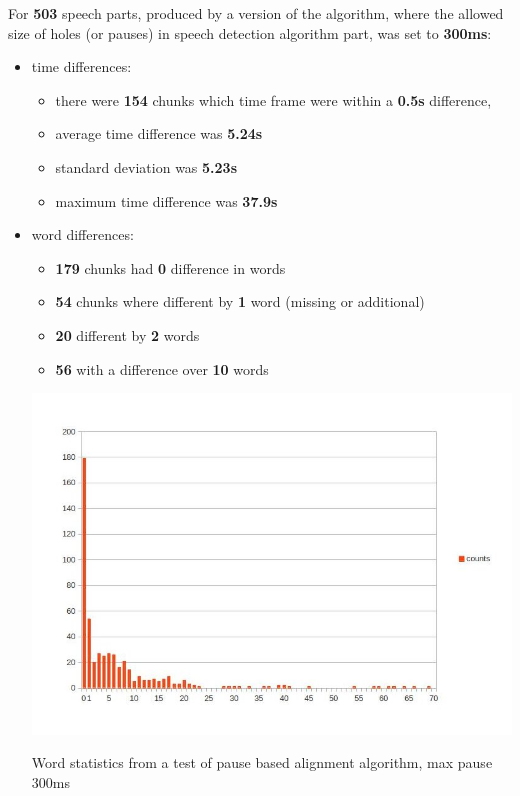 \documentclass[12pt,a4paper,english]{article}
\begin{document}
\newpage
For \textbf{503} speech parts, produced by a version of the algorithm, where the allowed size of holes (or pauses) in speech detection algorithm part,
was set to \textbf{300ms}:
\begin{itemize}
    \item time differences: \newline
    \begin{itemize}
        \item there were \textbf{154} chunks which time frame were within a \textbf{0.5s} difference, 
        \item average time difference was \textbf{5.24s}
        \item standard deviation was \textbf{5.23s}
        \item maximum time difference was \textbf{37.9s}
    \end{itemize}
    \item word differences:
    \begin{itemize}
        \item \textbf{179} chunks had \textbf{0} difference in words
        \item \textbf{54} chunks where different by \textbf{1} word (missing or additional)
        \item \textbf{20} different by \textbf{2} words
        \item \textbf{56} with a difference over \textbf{10} words
    \end{itemize}
    \begin{center}
        \includegraphics[scale=0.6]{length_based_results_worse.jpg}
        \caption[]{Word statistics from a test of pause based alignment algorithm, max pause 300ms}
    \end {center}
\end{itemize}
\end{document}
